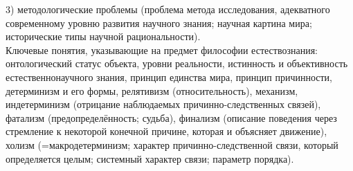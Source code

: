 \documentclass[exam_answers.tex]{subfiles}
\begin{document}
3) методологические проблемы (проблема метода исследования, адекватного современному уровню развития научного знания; научная картина мира; исторические типы научной рациональности).
\\

Ключевые понятия, указывающие на предмет философии естествознания:
онтологический статус объекта,
уровни реальности,
истинность и объективность естественнонаучного знания,
принцип единства мира,
принцип причинности,
детерминизм и его формы,
релятивизм (относительность), механизм, индетерминизм (отрицание наблюдаемых причинно-следственных связей), фатализм (предопределённость; судьба), финализм (описание поведения через стремление к некоторой конечной причине, которая и объясняет движение), холизм (=макродетерминизм; характер причинно-следственной связи, который определяется целым; системный характер связи; параметр порядка).
\end{document}
